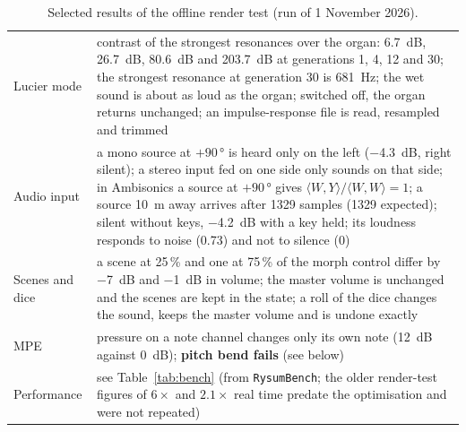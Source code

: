 \documentclass[11pt,a4paper,parskip=half,DIV=11,toc=bibliography]{scrartcl}
\newcommand{\fn}[1]{\mbox{\texttt{#1}}}
\begin{document}
\begin{table}[!htb]
\begin{tabularx}{\linewidth}{@{}lX@{}}
Lucier mode & contrast of the strongest resonances over the organ: \SI{6.7}{dB}, \SI{26.7}{dB}, \SI{80.6}{dB} and \SI{203.7}{dB} at generations 1, 4, 12 and 30; the strongest resonance at generation 30 is \SI{681}{Hz}; the wet sound is about as loud as the organ; switched off, the organ returns unchanged; an impulse-response file is read, resampled and trimmed \\
Audio input & a mono source at $+90\,°$ is heard only on the left (\SI{-4.3}{dB}, right silent); a stereo input fed on one side only sounds on that side; in Ambisonics a source at $+90\,°$ gives $\langle W,Y\rangle/\langle W,W\rangle=1$; a source \SI{10}{m} away arrives after 1329 samples (1329 expected); silent without keys, \SI{-4.2}{dB} with a key held; its loudness responds to noise (0.73) and not to silence (0) \\
Scenes and dice & a scene at 25\,\% and one at 75\,\% of the morph control differ by \SI{-7}{dB} and \SI{-1}{dB} in volume; the master volume is unchanged and the scenes are kept in the state; a roll of the dice changes the sound, keeps the master volume and is undone exactly \\
MPE & pressure on a note channel changes only its own note (\SI{12}{dB} against \SI{0}{dB}); \textbf{pitch bend fails} (see below) \\
Performance & see Table~\ref{tab:bench} (from \fn{RysumBench}; the older render-test figures of $6\times$ and $2.1\times$ real time predate the optimisation and were not repeated) \\
\bottomrule
\end{tabularx}
\caption{Selected results of the offline render test (run of 1 November 2026).}
\label{tab:tests}
\end{table}
\end{document}
